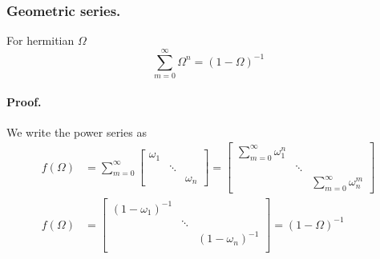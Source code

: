 \documentclass[../../../main.tex]{subfiles}
\begin{document}
\subsubsection{Geometric series.}
For hermitian $\Omega$
\begin{equation*}
	\sum_{m=0}^{\infty}\Omega^n=(1-\Omega)^{-1}
\end{equation*}

\paragraph*{Proof.}
We write the power series as
\begin{align*}
	f(\Omega) & =\sum_{m=0}^{\infty}
	\begin{bmatrix}
		\omega_1 &        &          \\
		         & \ddots &          \\
		         &        & \omega_n
	\end{bmatrix}
	=
	\begin{bmatrix}
		\sum_{m=0}^{\infty}\omega_1^n &        &                               \\
		                              & \ddots &                               \\
		                              &        & \sum_{m=0}^{\infty}\omega_n^m
	\end{bmatrix} \\
	f(\Omega) & =
	\begin{bmatrix}
		(1-\omega_1)^{-1} &        &                   \\
		                  & \ddots &                   \\
		                  &        & (1-\omega_n)^{-1} \\
	\end{bmatrix}
	=(1-\Omega)^{-1}
\end{align*}
\end{document}
